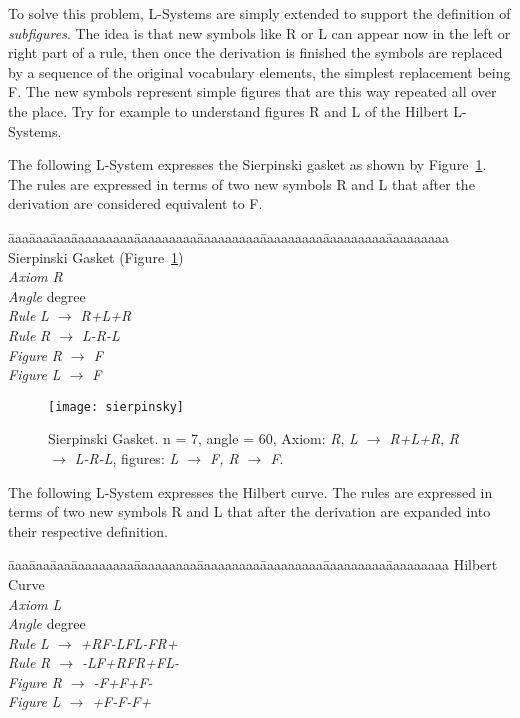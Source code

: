 To solve this problem, L-Systems are simply extended to support the
definition of \emph{subfigures}. The idea is that new symbols like R
or L can appear now in the left or right part of a rule, then once the
derivation is finished the symbols are replaced by a sequence of the
original vocabulary elements, the simplest replacement being F.  The
new symbols represent simple figures that are this way repeated all
over the place. Try for example to understand figures R and L of
the Hilbert L-Systems.



The following L-System expresses the Sierpinski gasket as shown by
Figure~\ref{fig:sierpinsky}. The rules are expressed in terms of two
new symbols R and L that after the derivation are considered
equivalent to F.

\begin{tabbing}
\=aaa\=aaa\=aaa\=aaaaaaaaa\=aaaaaaaaa\=aaaaaaaaa\=aaaaaaaaa\=aaaaaaaaa\=aaaaaaaaa\kill
Sierpinski Gasket (Figure~\ref{fig:sierpinsky})\\
\>\>\>\> \emph{Axiom} \>\>\emph{R}\\
\>\>\>\> \emph{Angle} \> degree\\
\>\>\>\> \emph{Rule}  \>\>\emph{L $\rightarrow$ R+L+R}\\
\>\>\>\> \emph{Rule}  \>\>\emph{R $\rightarrow$ L-R-L}\\
\>\>\>\> \emph{Figure}  \>\>\emph{R $\rightarrow$ F}\\
\>\>\>\> \emph{Figure}  \>\>\emph{L $\rightarrow$ F}
\end{tabbing}

\begin{figure}[!htbp]
\centerline{\texttt{[image: sierpinsky]}}
\caption{Sierpinski Gasket. n = 7, angle = 60, Axiom: \emph{R},  \emph{L $\rightarrow$ R+L+R}, \emph{R $\rightarrow$ L-R-L}, figures: \emph{L $\rightarrow$ F, R $\rightarrow$ F}.}
\label{fig:sierpinsky}
\end{figure}

The following L-System expresses the Hilbert curve. The rules are
expressed in terms of two new symbols R and L that after the
derivation are expanded into their respective definition.

\begin{tabbing}
\=aaa\=aaa\=aaa\=aaaaaaaaa\=aaaaaaaaa\=aaaaaaaaa\=aaaaaaaaa\=aaaaaaaaa\=aaaaaaaaa\kill
Hilbert Curve\\
\>\>\>\> \emph{Axiom} \>\>\emph{L}\\
\>\>\>\> \emph{Angle} \> degree\\
\>\>\>\> \emph{Rule}  \>\>\emph{L $\rightarrow$ +RF-LFL-FR+}\\
\>\>\>\> \emph{Rule}  \>\>\emph{R $\rightarrow$ -LF+RFR+FL-}\\
\>\>\>\> \emph{Figure}  \>\>\emph{R $\rightarrow$ -F+F+F-}\\
\>\>\>\> \emph{Figure}  \>\>\emph{L $\rightarrow$ +F-F-F+}
\end{tabbing}

